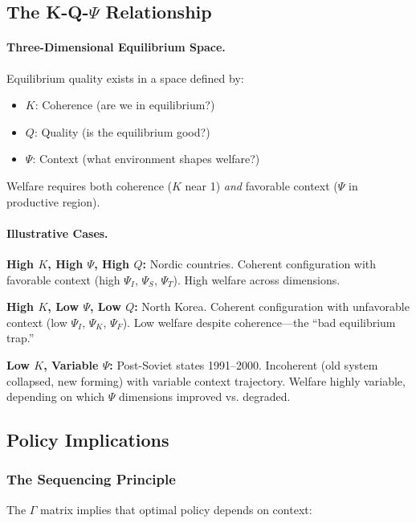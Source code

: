 \subsection{The K-Q-$\Psi$ Relationship}

\paragraph{Three-Dimensional Equilibrium Space.}
Equilibrium quality exists in a space defined by:
\begin{itemize}
  \item $K$: Coherence (are we in equilibrium?)
  \item $Q$: Quality (is the equilibrium good?)
  \item $\Psi$: Context (what environment shapes welfare?)
\end{itemize}

Welfare requires both coherence ($K$ near 1) \emph{and} favorable context ($\Psi$ in productive region).

\paragraph{Illustrative Cases.}

\textbf{High $K$, High $\Psi$, High $Q$:} Nordic countries.
Coherent configuration with favorable context (high $\Psi_I$, $\Psi_S$, $\Psi_T$).
High welfare across dimensions.

\textbf{High $K$, Low $\Psi$, Low $Q$:} North Korea.
Coherent configuration with unfavorable context (low $\Psi_I$, $\Psi_K$, $\Psi_F$).
Low welfare despite coherence---the ``bad equilibrium trap.''

\textbf{Low $K$, Variable $\Psi$:} Post-Soviet states 1991--2000.
Incoherent (old system collapsed, new forming) with variable context trajectory.
Welfare highly variable, depending on which $\Psi$ dimensions improved vs. degraded.

\subsection{Policy Implications}

\subsubsection{The Sequencing Principle}

The $\Gamma$ matrix implies that optimal policy depends on context:

